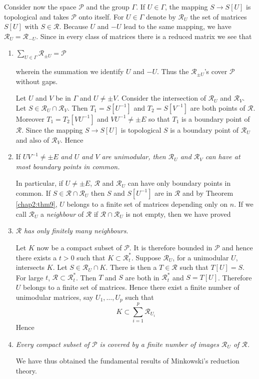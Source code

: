 Consider now the space $\mathscr{P}$ and the group $\Gamma$. If
$U\in\Gamma$, the mapping $S\to S[U]$ is topological and takes
$\mathscr{P}$ onto itself. For $U\in\Gamma$ denote by
$\mathscr{R}_{U}$ the set of matrices $S[U]$ with
$S\in\mathscr{R}$. Because $U$ and $-U$ lead to the same mapping, we
have $\mathscr{R}_{U}=\mathscr{R}_{-U}$. Since in every class of
matrices there is a reduced matrix we see that
\begin{enumerate}
\renewcommand{\labelenumi}{\theenumi)}
\item $\sum\limits_{U\in\Gamma}\mathscr{R}_{\pm U}=\mathscr{P}$

where\pageoriginale in the summation we identify $U$ and $-U$. Thus
the $\mathscr{R}_{\pm U}$'s cover $\mathscr{P}$ without gaps.

Let $U$ and $V$ be in $\Gamma$ and $U\neq \pm V$. Consider the
intersection of $\mathscr{R}_{U}$ and $\mathscr{R}_{V}$. Let
$S\in\mathscr{R}_{U}\cap \mathscr{R}_{V}$. Then $T_{1}=S[U^{-1}]$ and
$T_{2}=S[V^{-1}]$ are both points of $\mathscr{R}$. Moreover
$T_{1}=T_{2}[VU^{-1}]$ and $VU^{-1}\neq \pm E$ so that $T_{1}$ is a
boundary point of $\mathscr{R}$. Since the mapping $S\to S[U]$ is
topological $S$ is a boundary point of $\mathscr{R}_{U}$ and also of
$\mathscr{R}_{V}$. Hence 

\item If $UV^{-1}\neq \pm E$ {\em and $U$ and $V$ are unimodular, then
  $\mathscr{R}_{U}$ and $\mathscr{R}_{V}$ can have at most boundary
  points in common.}

In particular, if $U\neq \pm E$, $\mathscr{R}$ and $\mathscr{R}_{U}$
can have only boundary points in common. If $S\in\mathscr{R}\cap
\mathscr{R}_{U}$ then $S$ and $S[U^{-1}]$ are in $\mathscr{R}$ and by
Theorem \ref{chap2:thm9}, $U$ belongs to a finite set of matrices depending
only on $n$. If we call $\mathscr{R}_{U}$ a {\em neighbour} of
$\mathscr{R}$ if $\mathscr{R}\cap \mathscr{R}_{U}$ is not empty, then
we have proved

\item $\mathscr{R}$ {\em has only finitely many neighbours}.

Let $K$ now be a compact subset of $\mathscr{P}$. It is therefore
bounded in $\mathscr{P}$ and hence there exists a $t>0$ such that
$K\subset \mathscr{R}^{\ast}_{t}$. Suppose $\mathscr{R}_{U}$, for a
unimodular $U$, intersects $K$. Let $S\in\mathscr{R}_{U}\cap K$. There
is then a $T\in \mathscr{R}$ such that $T[U]=S$. For large $t$,
$\mathscr{R}\subset \mathscr{R}^{\ast}_{t}$. Then $T$ and $S$ are both
in $\mathscr{R}^{\ast}_{t}$ and $S=T[U]$. Therefore $U$  belongs to a
finite set of matrices. Hence there exist a finite number of
unimodular matrices, say $U_{1},\ldots,U_{p}$ such that
$$
K\subset \sum^{p}_{i=1}\mathscr{R}_{U_{i}}
$$
Hence\pageoriginale

\item {\em Every compact subset of $\mathscr{P}$ is covered by a
  finite number of images $\mathscr{R}_{U}$ of $\mathscr{R}$.}

We have thus obtained the fundamental results of Minkowski's reduction
theory.
\end{enumerate}

